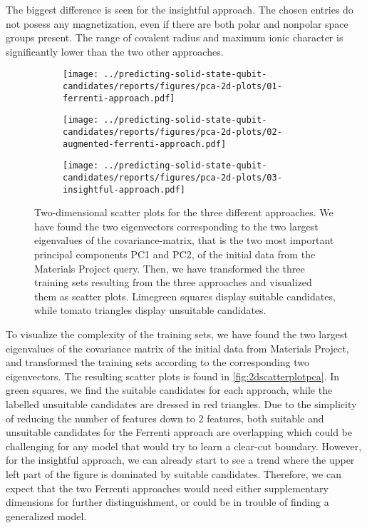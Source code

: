 The biggest difference is seen for the insightful approach. The chosen entries do not posess any magnetization, even if there are both polar and nonpolar space groups present. The range of covalent radius and maximum ionic character is significantly lower than the two other approaches.

\begin{figure}[!tbp]
    \centering
    \begin{subfigure}{0.5\textwidth}
        \centering
        \texttt{[image: ../predicting-solid-state-qubit-candidates/reports/figures/pca-2d-plots/01-ferrenti-approach.pdf]}
    \end{subfigure}%
    \begin{subfigure}{0.5\textwidth}
        \centering
        \texttt{[image: ../predicting-solid-state-qubit-candidates/reports/figures/pca-2d-plots/02-augmented-ferrenti-approach.pdf]}
    \end{subfigure}
    \begin{subfigure}{0.5\textwidth}
        \centering
        \texttt{[image: ../predicting-solid-state-qubit-candidates/reports/figures/pca-2d-plots/03-insightful-approach.pdf]}
    \end{subfigure}
    \vspace*{-95mm}
    \caption{Two-dimensional scatter plots for the three different approaches. We have found the two eigenvectors corresponding to the two largest eigenvalues of the covariance-matrix, that is the two most important principal components PC1 and PC2, of the initial data from the Materials Project query. Then, we have transformed the three training sets resulting from the three approaches and visualized them as scatter plots. Limegreen squares display suitable candidates, while tomato triangles display unsuitable candidates.}
    \label{fig:2dscatterplotpca}
\end{figure}

To visualize the complexity of the training sets, we have found the two largest eigenvalues of the covariance matrix of the initial data from Materials Project, and transformed the training sets according to the corresponding two eigenvectors. The resulting scatter plots is found in \autoref{fig:2dscatterplotpca}. In green squares, we find the suitable candidates for each approach, while the labelled unsuitable candidates are dressed in red triangles. Due to the simplicity of reducing the number of features down to $2$ features, both suitable and unsuitable candidates for the Ferrenti approach are overlapping which could be challenging for any model that would try to learn a clear-cut boundary. However, for the insightful approach, we can already start to see a trend where the upper left part of the figure is dominated by suitable candidates. Therefore, we can expect that the two Ferrenti approaches would need either supplementary dimensions for further distinguishment, or could be in trouble of finding a generalized model.



